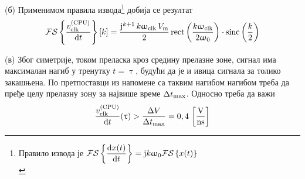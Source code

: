     (б) Применимом правила извода\footnote{Правило извода је 
    $
    \mathcal{FS}\left\{\dfrac{{\rm d} x(t)}{{\rm d} t}\right\} = {\rm j} k \upomega_{\rm 0} 
    \mathcal{FS}\left\{ x(t) \right\} $ \\[1mm]} добија се резултат
    \begin{equation}
        \mathcal{FS}\left\{ \dfrac{v_{\rm clk}^{\rm (CPU)}}{{\rm d} t}\right\} [k]
        = 
        \dfrac{ 
        {\rm j}^{k+1} \,
        k \upomega_{\rm clk} \, 
        V_{\rm m} }{2}
        \operatorname{rect} \left( \dfrac{k{\upomega_{\rm clk}}}{2\upomega_0} \right) 
        \cdot
        \operatorname{sinc} \left(
        \dfrac{k}{2} \right)
    \end{equation}

    (в) 
    Због симетрије, током преласка кроз средину прелазне зоне, сигнал има максималан нагиб у тренутку 
    $t = \uptau$, будући да је и ивица сигнала за толико закашњена. По претпоставци из напомене 
    са таквим нагибом нагибом треба да пређе целу прелазну зону за највише време 
    $\Delta t_{\rm max}$. Односно треба да важи
    \begin{equation}
        \dfrac{ v_{\rm clk}^{\rm (CPU)} }{\de t} (\uptau) > \dfrac{\Delta V}{\Delta t_{\rm max}}
        = 0,4\unit{\dfrac{V}{ns}}  \label{eq:\ID.uslov}
    \end{equation}

